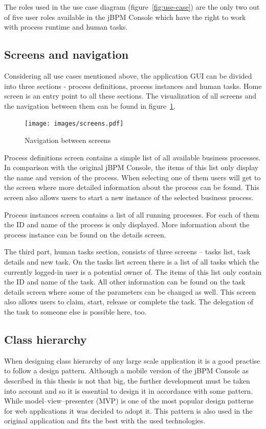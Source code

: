 \documentclass[12pt,oneside,final]{fithesis2}
\begin{document}
The roles used in the use case diagram (figure~\ref{fig:use-case}) are the only two out of five user roles available in the jBPM Console which have the right to work with process runtime and human tasks. \cite{jbpm6roles}

\subsection{Screens and navigation}
Considering all use cases mentioned above, the application GUI can be divided into three sections - process definitions, process instances and human tasks.
Home screen is an entry point to all these sections.
The visualization of all screens and the navigation between them can be found in figure~\ref{fig:screens}.

\begin{figure}[ht!]
\centering
\texttt{[image: images/screens.pdf]}
\caption{Navigation between screens}
\label{fig:screens}
\end{figure}

Process definitions screen contains a simple list of all available business processes.
In comparison with the original jBPM Console, the items of this list only display the name and version of the process.
When selecting one of them users will get to the screen where more detailed information about the process can be found.
This screen also allows users to start a new instance of the selected business process.

Process instances screen contains a list of all running processes.
For each of them the ID and name of the process is only displayed.
More information about the process instance can be found on the details screen.

The third part, human tasks section, consists of three screens -- tasks list, task details and new task.
On the tasks list screen there is a list of all tasks which the currently logged-in user is a potential owner of\footnotemark{}.
The items of this list only contain the ID and name of the task.
All other information can be found on the task details screen where some of the parameters can be changed as well.
This screen also allows users to claim, start, release or complete the task.
The delegation of the task to someone else is possible here, too.

\subsection{Class hierarchy}
When designing class hierarchy of any large scale application it is a good practise to follow a design pattern.
Although a mobile version of the jBPM Console as described in this thesis is not that big, the further development must be taken into account and so it is essential to design it in accordance with some pattern.
While model–view–presenter (MVP) is one of the most popular design patterns for web applications it was decided to adopt it.
This pattern is also used in the original application and fits the best with the used technologies. \cite{ramsdale10}
\end{document}
